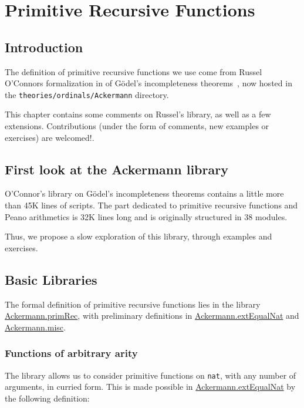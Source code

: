 \chapter{Primitive Recursive Functions}

\section{Introduction}
The definition of primitive recursive functions we use come
from Russel O'Connors formalization in \coq{} of
G\"odel's incompleteness theorems~\cite{OConnor05}, now hosted in
the \texttt{theories/ordinals/Ackermann} directory.

This chapter contains some comments on Russel's library, as well as a few extensions.
Contributions (under the form of comments, new examples or exercises) are welcomed!. 

\section{First look at the Ackermann library}

O'Connor's library on Gödel's incompleteness theorems contains a little more 
than 45K lines of scripts. The part dedicated to primitive recursive functions and Peano arithmetics is 32K lines long and is originally structured in 38 modules.

Thus, we propose a slow exploration of this library, through examples and exercises.

\section{Basic Libraries}

The formal definition of primitive recursive functions lies in the library
\href{../theories/html/hydras.Ackermann.primRec.html}{Ackermann.primRec},
with preliminary definitions in 
\href{../theories/html/hydras.Ackermann.extEqualNat.html}{Ackermann.extEqualNat}
and
\href{../theories/html/hydras.Ackermann.misc.html}{Ackermann.misc}.

\subsection{Functions of arbitrary arity}

The library allows us to consider primitive functions on \texttt{nat}, with any number of arguments, in 
curried form. This is made possible in 
\href{../theories/html/hydras.Ackermann.extEqualNat.html}{Ackermann.extEqualNat} by the following definition:

